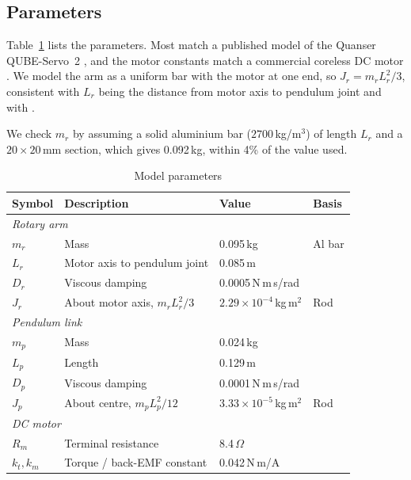 \subsection{Parameters}
Table~\ref{tab:params} lists the parameters. Most match a published model of the Quanser QUBE-Servo~2 \cite{xu2023}, and the motor constants match a commercial coreless DC motor \cite{allied}. We model the arm as a uniform bar with the motor at one end, so $J_r=m_rL_r^2/3$, consistent with $L_r$ being the distance from motor axis to pendulum joint and with \cite{gafvert1998}. \begin{rw}We check $m_r$ by assuming a solid aluminium bar ($2700$\,kg/m$^3$) of length $L_r$ and a $20\times20$\,mm section, which gives 0.092\,kg, within 4\% of the value used.\end{rw}
\begin{table}[t]
\caption{Model parameters}\label{tab:params}
\centering\footnotesize\setlength{\tabcolsep}{3pt}
\begin{tabular}{llll}
\hline
Symbol & Description & Value & Basis\\ \hline
\multicolumn{4}{l}{\textit{Rotary arm}}\\
$m_r$ & Mass & 0.095\,kg & Al bar\\
$L_r$ & Motor axis to pendulum joint & 0.085\,m & \cite{xu2023}\\
$D_r$ & Viscous damping & 0.0005\,N\,m\,s/rad & \cite{xu2023}\\
$J_r$ & About motor axis, $m_rL_r^2/3$ & $2.29\times10^{-4}$\,kg\,m$^2$ & Rod\\ \hline
\multicolumn{4}{l}{\textit{Pendulum link}}\\
$m_p$ & Mass & 0.024\,kg & \cite{xu2023}\\
$L_p$ & Length & 0.129\,m & \cite{xu2023}\\
$D_p$ & Viscous damping & 0.0001\,N\,m\,s/rad & \cite{xu2023}\\
$J_p$ & About centre, $m_pL_p^2/12$ & $3.33\times10^{-5}$\,kg\,m$^2$ & Rod\\ \hline
\multicolumn{4}{l}{\textit{DC motor}}\\
$R_m$ & Terminal resistance & 8.4\,$\Omega$ & \cite{xu2023}\\
$k_t, k_m$ & Torque / back-EMF constant & 0.042\,N\,m/A & \cite{xu2023}\\ \hline
\end{tabular}
\end{table}

